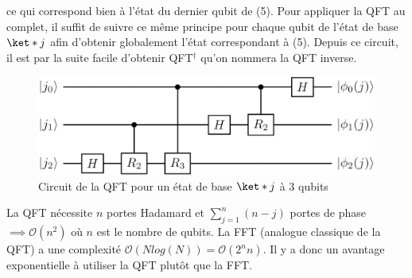 ce qui correspond bien à l'état du dernier qubit de (5). Pour appliquer la QFT au complet, il suffit de suivre ce même principe pour chaque qubit de l'état de base $\ket*{j}$ afin d'obtenir globalement l'état correspondant à (5). Depuis ce circuit, il est par la suite facile d'obtenir QFT$^\dag$ qu'on nommera la QFT inverse.

\begin{figure}[H]
    \centering
    \includegraphics[scale=0.3]{images/circuit_qft.png} 
    \caption{Circuit de la QFT pour un état de base $\ket*{j}$ à 3 qubits}
\end{figure}

La QFT nécessite $n$ portes Hadamard et $\sum_{j=1}^{n}(n-j)$ portes de phase $\implies \mathcal{O}(n^2)$ où $n$ est le nombre de qubits. La FFT (analogue classique de la QFT) a une complexité $\mathcal{O}(Nlog(N)) = \mathcal{O}(2^n n)$. Il y a donc un avantage exponentielle à utiliser la QFT plutôt que la FFT. 